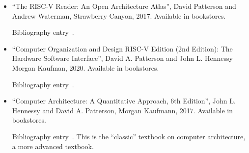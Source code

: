 \begin{itemize}

  \item ``The RISC-V Reader: An Open Architecture Atlas'',
    David Patterson and Andrew Waterman,
    Strawberry Canyon, 2017.  Available in bookstores.

    Bibliography entry~\cite{PattersonWaterman2017}.

  \item
    ``Computer Organization and Design RISC-V Edition (2nd Edition): The Hardware Software Interface'',
    David A. Patterson and John L. Hennessy
    Morgan Kaufman, 2020. Available in bookstores.

    Bibliography entry~\cite{PattersonHennessy2020}.

  \item ``Computer Architecture: A Quantitative Approach, 6th Edition'',
    John L. Hennessy and David A. Patterson,
    Morgan Kaufmann, 2017.  Available in bookstores.

    Bibliography entry~\cite{Hennessy2017}.
    This is the ``classic'' textbook on computer architecture, a more
    advanced textbook.

\end{itemize}

